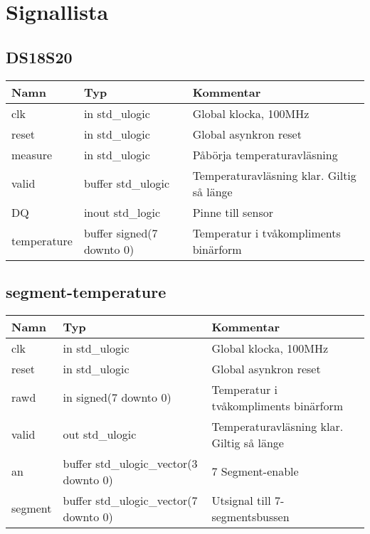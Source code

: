 \section{Signallista}
\subsection{DS18S20}\label{sec:sig:ds18s20}
\begin{table}[H]
	\begin{tabularx}{\textwidth}{p{2cm} p{4.3cm} X}
		\hline
		\textbf{Namn} & \textbf{Typ} & \textbf{Kommentar} \\
		\hline
		clk & in std\_ulogic & Global klocka, 100MHz \\
		reset & in std\_ulogic & Global asynkron reset \\
		measure & in std\_ulogic & Påbörja temperaturavläsning \\
		valid & buffer std\_ulogic & Temperaturavläsning klar. 
			Giltig så länge \signal{valid = '1'} \\
		DQ & inout std\_logic & Pinne till sensor \\
		temperature & buffer signed(7 downto 0) & Temperatur i tvåkompliments binärform \\
		\hline
	\end{tabularx}
\end{table}


\subsection{segment-temperature}\label{sec:sig:segment}
\begin{table}[H]
	\begin{tabularx}{\textwidth}{p{2cm} p{4.3cm} X}
		\hline
		\textbf{Namn} & \textbf{Typ} & \textbf{Kommentar} \\
		\hline
		clk & in std\_ulogic & Global klocka, 100MHz \\
		reset & in std\_ulogic & Global asynkron reset \\
		rawd & in signed(7 downto 0) & Temperatur i tvåkompliments binärform \\
		valid & out std\_ulogic & Temperaturavläsning klar. 
			Giltig så länge \signal{valid = '1'} \\
		an & buffer std\_ulogic\_vector(3 downto 0) & 7 Segment-enable \\
		segment & buffer std\_ulogic\_vector(7 downto 0) & Utsignal till 7-segmentsbussen \\
		\hline
	\end{tabularx}
\end{table}

